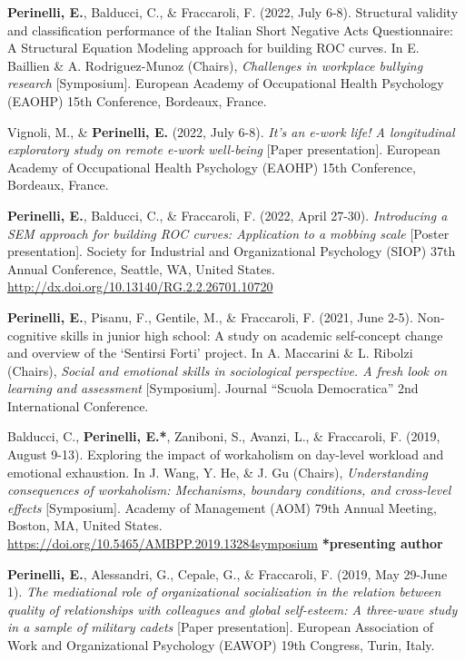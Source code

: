 \documentclass[hidelinks, letterpaper,10pt]{article} %
\begin{document}
\begin{etaremune}
    \item \textbf{Perinelli, E.}, Balducci, C., \& Fraccaroli, F. (2022, July 6-8). Structural validity and classification performance of the Italian Short Negative Acts Questionnaire: A Structural Equation Modeling approach for building ROC curves. In E. Baillien \& A. Rodriguez-Munoz (Chairs), \textit{Challenges in workplace bullying research} [Symposium]. European Academy of Occupational Health Psychology (EAOHP) 15th Conference, Bordeaux, France.
    
    \item Vignoli, M., \& \textbf{Perinelli, E.} (2022, July 6-8). \textit{It’s an e-work life! A longitudinal exploratory study on remote e-work well-being} [Paper presentation]. European Academy of Occupational Health Psychology (EAOHP) 15th Conference, Bordeaux, France. 

   \item \textbf{Perinelli, E.}, Balducci, C., \& Fraccaroli, F. (2022, April 27-30). \textit{Introducing a SEM approach for building ROC curves: Application to a mobbing scale} [Poster presentation]. Society for Industrial and Organizational Psychology (SIOP) 37th Annual Conference, Seattle, WA, United States. \url{http://dx.doi.org/10.13140/RG.2.2.26701.10720} 

    \item \textbf{Perinelli, E.}, Pisanu, F., Gentile, M., \& Fraccaroli, F. (2021, June 2-5). Non-cognitive skills in junior high school: A study on academic self-concept change and overview of the ‘Sentirsi Forti’ project. In A. Maccarini \& L. Ribolzi (Chairs), \textit{Social and emotional skills in sociological perspective. A fresh look on learning and assessment} [Symposium]. Journal “Scuola Democratica” 2nd International Conference.

    \item Balducci, C., \textbf{Perinelli, E.*}, Zaniboni, S., Avanzi, L., \& Fraccaroli, F. (2019, August 9-13). Exploring the impact of workaholism on day-level workload and emotional exhaustion. In J. Wang, Y. He, \& J. Gu (Chairs), \textit{Understanding consequences of workaholism: Mechanisms, boundary conditions, and cross-level effects} [Symposium]. Academy of Management (AOM) 79th Annual Meeting, Boston, MA, United States. \url{https://doi.org/10.5465/AMBPP.2019.13284symposium}   \textbf{*presenting author}

    \item \textbf{Perinelli, E.}, Alessandri, G., Cepale, G., \& Fraccaroli, F. (2019, May 29-June 1). \textit{The mediational role of organizational socialization in the relation between quality of relationships with colleagues and global self-esteem: A three-wave study in a sample of military cadets} [Paper presentation]. European Association of Work and Organizational Psychology (EAWOP) 19th Congress, Turin, Italy.


\end{etaremune}
\end{document}
